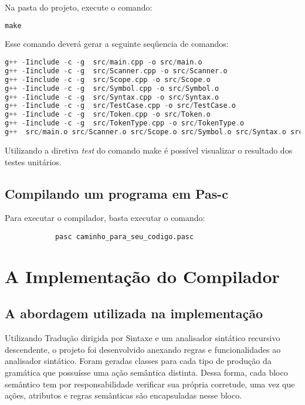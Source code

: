 \documentclass[11pt]{article}
\begin{document}
		Na pasta do projeto, execute o comando:
\begin{lstlisting}[language=C++]
make
\end{lstlisting} 
		
		Esse comando deverá gerar a seguinte seqûencia de comandos:
\begin{lstlisting}[language=C++]
g++ -Iinclude -c -g  src/main.cpp -o src/main.o
g++ -Iinclude -c -g  src/Scanner.cpp -o src/Scanner.o
g++ -Iinclude -c -g  src/Scope.cpp -o src/Scope.o
g++ -Iinclude -c -g  src/Symbol.cpp -o src/Symbol.o
g++ -Iinclude -c -g  src/Syntax.cpp -o src/Syntax.o
g++ -Iinclude -c -g  src/TestCase.cpp -o src/TestCase.o
g++ -Iinclude -c -g  src/Token.cpp -o src/Token.o
g++ -Iinclude -c -g  src/TokenType.cpp -o src/TokenType.o
g++  src/main.o src/Scanner.o src/Scope.o src/Symbol.o src/Syntax.o src/TestCase.o src/Token.o src/TokenType.o -o pasc
\end{lstlisting}

	Utilizando a diretiva \textit{test} do comando make é possível visualizar o resultado dos testes unitários.
	
	\subsection{Compilando um programa em Pas-c}
	
		Para executar o compilador, basta executar o comando:
		
		\begin{verbatim}
			pasc caminho_para_seu_codigo.pasc
		\end{verbatim}
	

\newpage
\section{A Implementação do Compilador}
	
	\subsection{A abordagem utilizada na implementação}
		
		Utilizando Tradução dirigida por Sintaxe e um analisador sintático recursivo descendente, o projeto foi desenvolvido anexando regras e funcionalidades ao analisador sintático. Foram geradas classes para cada tipo de produção da gramática que possuísse uma ação semântica distinta. Dessa forma, cada bloco semântico tem por responsabilidade verificar sua própria corretude, uma vez que ações, atributos e regras semânticas são encapsuladas nesse bloco.
		
\end{document}
